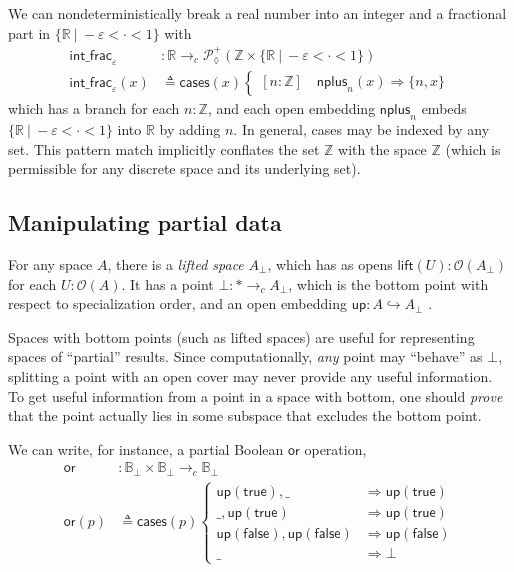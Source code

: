 \documentclass[conference]{IEEEtran}
\newcommand{\PLower}{\mathcal{P}_\lozenge}
\newcommand{\hookto}{\hookrightarrow}
\newcommand{\cto}{\to_c}
\newcommand{\R}{\mathbb{R}}
\newcommand{\Z}{\mathbb{Z}}
\newcommand{\suchthat}{\ |\ }
\newcommand{\One}{\ast}
\newcommand{\Open}[1]{\mathcal{O}({#1})}
\newcommand{\bool}{\mathbb{B}}
\newcommand{\wildcard}{\_}
\newcommand{\Branch}{\Rightarrow}
\newcommand{\up}{\mathsf{up}}
\newcommand{\btrue}{\mathsf{true}}
\newcommand{\bfalse}{\mathsf{false}}
\begin{document}
We can nondeterministically break a real number into an integer and a fractional part in $\{ \R \suchthat -\varepsilon < \cdot < 1 \}$ with
\begin{align*}
\mathsf{int\_frac}_\varepsilon &: \R \cto \PLower^+(\Z \times \{ \R \suchthat -\varepsilon < \cdot < 1 \})
\\ \mathsf{int\_frac}_\varepsilon(x) &\triangleq \mathsf{cases}(x)
\begin{cases}
[n : \Z] \quad \mathsf{nplus}_n(x) \Branch \{ n, x \}
\end{cases}
\end{align*}
which has a branch for each $n : \Z$, and each open embedding $\mathsf{nplus}_n$ embeds $\{ \R \suchthat -\varepsilon < \cdot < 1 \}$ into $\R$ by adding $n$. In general, cases may be indexed by any set. This pattern match implicitly conflates the set $\Z$ with the space $\Z$ (which is permissible for any discrete space and its underlying set).

\subsection{Manipulating partial data}

For any space $A$, there is a \emph{lifted space} $A_\bot$, which has as opens $\mathsf{lift}(U) : \Open{A_\bot}$ for each $U : \Open{A}$. It has a point $\bot : \One \cto A_\bot$, which is the bottom point with respect to specialization order, and an open embedding $ \up : A \hookto A_\bot$  \cite{topologyvialogic}.

Spaces with bottom points (such as lifted spaces) are useful for representing spaces of ``partial'' results. Since computationally, \emph{any} point may ``behave'' as $\bot$, splitting a point with an open cover may never provide any useful information. To get useful information from a point in a space with bottom, one should \emph{prove} that the point actually lies in some subspace that excludes the bottom point.

We can write, for instance, a partial Boolean $\mathsf{or}$ operation,
\begin{align*}
\mathsf{or} &: \bool_\bot \times \bool_\bot \cto \bool_\bot
\\ \mathsf{or}(p) &\triangleq \mathsf{cases}(p)
\begin{cases}
\up(\btrue), \wildcard &\Branch \up(\btrue)
\\ \wildcard, \up(\btrue) &\Branch \up(\btrue)
\\ \up(\bfalse), \up(\bfalse) &\Branch \up(\bfalse)
\\ \wildcard &\Branch \bot
\end{cases}
\end{align*}
\end{document}
